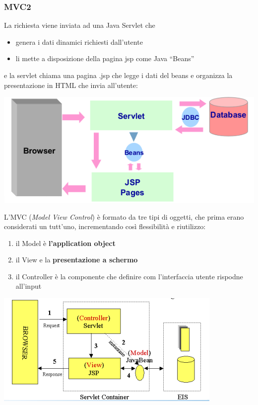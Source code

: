 \documentclass[a4paper,12pt, oneside]{book}
\begin{document}
\subsubsection{MVC2}
La richiesta viene inviata ad una Java Servlet che
\begin{itemize}
	\item genera i dati dinamici richiesti dall’utente
	\item li mette a disposizione della pagina jsp come Java “Beans”
\end{itemize}
e la servlet chiama una pagina .jsp che legge i dati del beans e organizza la presentazione in HTML che invia all'utente:
\begin{center}
	\includegraphics[scale=0.7]{img/mvc2.png}
\end{center}
L'MVC (\textit{Model View Control}) è formato da tre tipi di oggetti, che prima erano considerati un tutt'uno, incrementando così flessibilità e riutilizzo:
\begin{enumerate}
	\item il Model è \textbf{l'application object}
	\item il View e la \textbf{presentazione a schermo}
	\item il Controller è la componente che definire com l'interfaccia utente rispodne all'input
\end{enumerate}
\begin{center}
	\includegraphics[scale=0.7]{img/mvc22.png}
\end{center}
\end{document}
